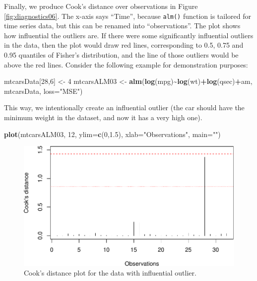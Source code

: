 \documentclass[
]{book}
\newenvironment{Shaded}{\begin{snugshade}}{\end{snugshade}}
\newcommand{\DataTypeTok}[1]{\textcolor[rgb]{0.13,0.29,0.53}{#1}}
\newcommand{\DecValTok}[1]{\textcolor[rgb]{0.00,0.00,0.81}{#1}}
\newcommand{\FloatTok}[1]{\textcolor[rgb]{0.00,0.00,0.81}{#1}}
\newcommand{\KeywordTok}[1]{\textcolor[rgb]{0.13,0.29,0.53}{\textbf{#1}}}
\newcommand{\NormalTok}[1]{#1}
\newcommand{\OperatorTok}[1]{\textcolor[rgb]{0.81,0.36,0.00}{\textbf{#1}}}
\newcommand{\StringTok}[1]{\textcolor[rgb]{0.31,0.60,0.02}{#1}}
\theoremstyle{definition}
\theoremstyle{definition}
\theoremstyle{definition}
\theoremstyle{definition}
\theoremstyle{remark}
\begin{document}
Finally, we produce Cook's distance over observations in Figure \ref{fig:diagnostics06}. The x-axis says ``Time'', because \texttt{alm()} function is tailored for time series data, but this can be renamed into ``observations''. The plot shows how influential the outliers are. If there were some significantly influential outliers in the data, then the plot would draw red lines, corresponding to 0.5, 0.75 and 0.95 quantiles of Fisher's distribution, and the line of those outliers would be above the red lines. Consider the following example for demonstration purposes:

\begin{Shaded}
\begin{Highlighting}[]
\NormalTok{mtcarsData[}\DecValTok{28}\NormalTok{,}\DecValTok{6}\NormalTok{] \textless{}{-}}\StringTok{ }\DecValTok{4}
\NormalTok{mtcarsALM03 \textless{}{-}}\StringTok{ }\KeywordTok{alm}\NormalTok{(}\KeywordTok{log}\NormalTok{(mpg)}\OperatorTok{\textasciitilde{}}\KeywordTok{log}\NormalTok{(wt)}\OperatorTok{+}\KeywordTok{log}\NormalTok{(qsec)}\OperatorTok{+}\NormalTok{am, mtcarsData, }\DataTypeTok{loss=}\StringTok{"MSE"}\NormalTok{)}
\end{Highlighting}
\end{Shaded}

This way, we intentionally create an influential outlier (the car should have the minimum weight in the dataset, and now it has a very high one).

\begin{Shaded}
\begin{Highlighting}[]
\KeywordTok{plot}\NormalTok{(mtcarsALM03, }\DecValTok{12}\NormalTok{, }\DataTypeTok{ylim=}\KeywordTok{c}\NormalTok{(}\DecValTok{0}\NormalTok{,}\FloatTok{1.5}\NormalTok{), }\DataTypeTok{xlab=}\StringTok{"Observations"}\NormalTok{, }\DataTypeTok{main=}\StringTok{""}\NormalTok{)}
\end{Highlighting}
\end{Shaded}

\begin{figure}
\centering
\includegraphics{Svetunkov---Statistics-for-Business-Analytics_files/figure-latex/diagnostics07-1.pdf}
\caption{\label{fig:diagnostics07}Cook's distance plot for the data with influential outlier.}
\end{figure}
\end{document}

